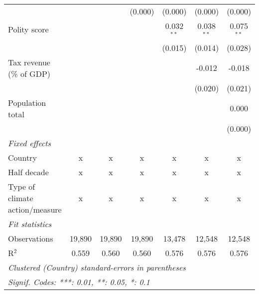 \begin{tabular}{lcccccc}
                                                                                       &               &                & (0.000)        & (0.000)        & (0.000)        & (0.000)\\   
   Polity score                                                                        &               &                &                & 0.032$^{**}$   & 0.038$^{**}$   & 0.075$^{**}$\\   
                                                                                       &               &                &                & (0.015)        & (0.014)        & (0.028)\\   
   Tax revenue (\% of GDP)                                                             &               &                &                &                & -0.012         & -0.018\\   
                                                                                       &               &                &                &                & (0.020)        & (0.021)\\   
   Population total                                                                    &               &                &                &                &                & 0.000\\   
                                                                                       &               &                &                &                &                & (0.000)\\   
   \emph{Fixed effects}\\
   Country                                                                             & x             & x              & x              & x              & x              & x\\  
   Half decade                                                                         & x             & x              & x              & x              & x              & x\\  
   Type of climate action/measure                                                      & x             & x              & x              & x              & x              & x\\  
   \midrule \emph{Fit statistics}\\
   Observations                                                                        & 19,890        & 19,890         & 19,890         & 13,478         & 12,548         & 12,548\\  
   R$^2$                                                                               & 0.559         & 0.560          & 0.560          & 0.576          & 0.576          & 0.576\\  
   \midrule
   \multicolumn{7}{l}{\emph{Clustered (Country) standard-errors in parentheses}}\\
   \multicolumn{7}{l}{\emph{Signif. Codes: ***: 0.01, **: 0.05, *: 0.1}}\\
\end{tabular}
\par\endgroup


